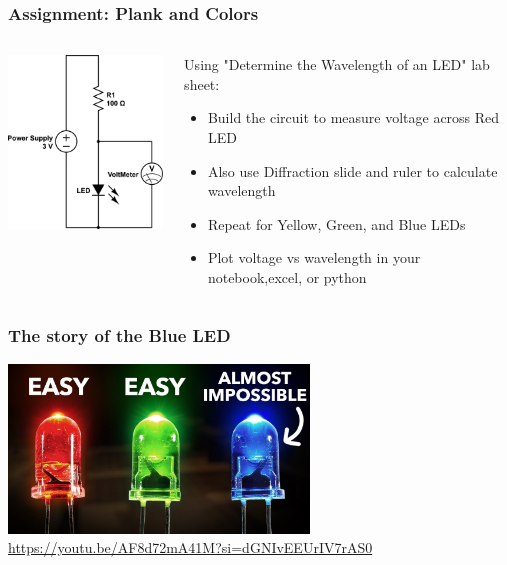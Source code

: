 \documentclass{beamer}
\begin{document}
\begin{frame}\frametitle{Assignment: Plank and Colors}
\begin{columns}
\begin{column}{5cm}
\begin{center}
\includegraphics[width=5cm]{fig/plank.png}
\end{center}
\end{column}
\begin{column}{6cm}
Using "Determine the Wavelength of an LED" lab sheet:
\begin{itemize}
\item Build the circuit to measure voltage across Red LED
\item Also use Diffraction slide and ruler to calculate wavelength
\item Repeat for Yellow, Green, and Blue LEDs
\item Plot voltage vs wavelength in your notebook,excel, or python
\end{itemize}
\end{column}
\end{columns}
\end{frame}


\begin{frame}\frametitle{The story of the Blue LED}
\begin{center}
\includegraphics[width=8cm]{fig/blueLED.jpg}
\url{https://youtu.be/AF8d72mA41M?si=dGNIvEEUrIV7rAS0}
\end{center}
\end{frame}
\end{document}
